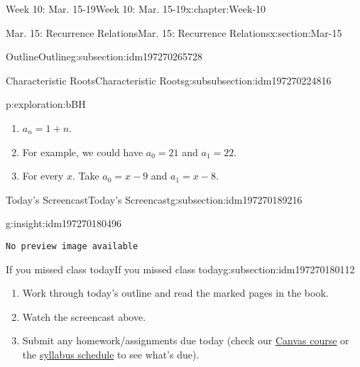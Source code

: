 \documentclass[oneside,10pt,]{book}
\newcommand{\mono}[1]{\texttt{#1}}
\numberwithin{equation}{section}
\newlength{\qrsize}
\newlength{\previewwidth}
\begin{document}
\begin{chapterptx}{Week 10: Mar. 15-19}{}{Week 10: Mar. 15-19}{}{}{x:chapter:Week-10}
\begin{sectionptx}{Mar. 15: Recurrence Relations}{}{Mar. 15: Recurrence Relations}{}{}{x:section:Mar-15}
\begin{subsectionptx}{Outline}{}{Outline}{}{}{g:subsection:idm197270265728}
\begin{subsubsectionptx}{Characteristic Roots}{}{Characteristic Roots}{}{}{g:subsubsection:idm197270224816}
\begin{exploration}{}{p:exploration:bBH}
\begin{enumerate}
\item{}\(a_n = 1 + n\).%
\item{}For example, we could have \(a_0 = 21\) and \(a_1 = 22\).%
\item{}For every \(x\). Take \(a_0 = x-9\) and \(a_1 = x-8\).%
\end{enumerate}
%
\end{exploration}%
\end{subsubsectionptx}
\end{subsectionptx}
%
%
\typeout{************************************************}
\typeout{************************************************}
%
\begin{subsectionptx}{Today's Screencast}{}{Today's Screencast}{}{}{g:subsection:idm197270189216}
\begin{insight}{}{g:insight:idm197270180496}%
\setlength{\qrsize}{9em}
\setlength{\previewwidth}{\linewidth}
\addtolength{\previewwidth}{-\qrsize}
\begin{tcbraster}[raster columns=2, raster column skip=1pt, raster halign=center, raster force size=false, raster left skip=0pt, raster right skip=0pt]%
\begin{tcolorbox}[previewstyle, width=\previewwidth]%
\mono{No preview image available}%
\end{tcolorbox}%
\begin{tcolorbox}[qrstyle]%
[QR LINK]\end{tcolorbox}%
\end{tcbraster}%
\end{insight}
\end{subsectionptx}
%
%
\typeout{************************************************}
\typeout{************************************************}
%
\begin{subsectionptx}{If you missed class today}{}{If you missed class today}{}{}{g:subsection:idm197270180112}
%
\begin{enumerate}
\item{}Work through today's outline and read the marked pages in the book.%
\item{}Watch the screencast above.%
\item{}Submit any homework\slash{}assignments due today (check our \href{https://dordt.instructure.com/courses/3110050}{Canvas course} or the \href{https://prof.mkjanssen.org/ds/index.html\#schedule}{syllabus schedule} to see what's due).%

\end{enumerate}
\end{subsectionptx}
\end{sectionptx}
\end{chapterptx}
\end{document}

